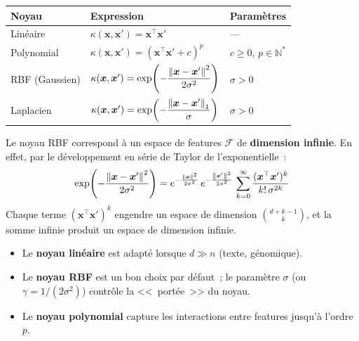 \begin{formules}[title=\textbf{Noyaux couramment utilis\'es}]
\begin{center}
\renewcommand{\arraystretch}{1.6}
\begin{tabular}{lll}
\toprule
\textbf{Noyau} & \textbf{Expression} & \textbf{Param\`etres} \\
\midrule
Lin\'eaire &
  $\kappa(\bm{x}, \bm{x}') = \bm{x}^\top \bm{x}'$ &
  --- \\
Polynomial &
  $\kappa(\bm{x}, \bm{x}') = (\bm{x}^\top \bm{x}' + c)^p$ &
  $c \geq 0$, $p \in \mathbb{N}^*$ \\
RBF (Gaussien) &
  $\kappa(\bm{x}, \bm{x}') = \exp\!\left(-\dfrac{\left\| \bm{x} - \bm{x}' \right\|^2}{2\sigma^2}\right)$ &
  $\sigma > 0$ \\
Laplacien &
  $\kappa(\bm{x}, \bm{x}') = \exp\!\left(-\dfrac{\left\| \bm{x} - \bm{x}' \right\|_1}{\sigma}\right)$ &
  $\sigma > 0$ \\
\bottomrule
\end{tabular}
\end{center}
\end{formules}

\begin{proposition}
\label{prop:rbf-infinite}
Le noyau RBF correspond \`a un espace de features $\mathcal{F}$ de
\textbf{dimension infinie}. En effet, par le d\'eveloppement en s\'erie
de Taylor de l'exponentielle~:
\begin{equation}
  \exp\!\left(-\frac{\left\| \bm{x} - \bm{x}' \right\|^2}{2\sigma^2}\right)
  = e^{-\frac{\left\| \bm{x} \right\|^2}{2\sigma^2}}\,
    e^{-\frac{\left\| \bm{x}' \right\|^2}{2\sigma^2}}\,
    \sum_{k=0}^{\infty} \frac{(\bm{x}^\top \bm{x}')^k}
    {k!\, \sigma^{2k}}
\end{equation}
Chaque terme $(\bm{x}^\top \bm{x}')^k$ engendre un espace de dimension
$\binom{d + k - 1}{k}$, et la somme infinie produit un espace de
dimension infinie.
\end{proposition}

\begin{attention}[title=\textbf{Choix du noyau}]
\begin{itemize}
  \item Le \textbf{noyau lin\'eaire} est adapt\'e lorsque $d \gg n$
    (texte, g\'enomique).
  \item Le \textbf{noyau RBF} est un bon choix par d\'efaut~; le
    param\`etre $\sigma$ (ou $\gamma = 1/(2\sigma^2)$) contr\^ole la
    <<~port\'ee~>> du noyau.
  \item Le \textbf{noyau polynomial} capture les interactions entre
    features jusqu'\`a l'ordre $p$.
\end{itemize}
\end{attention}

